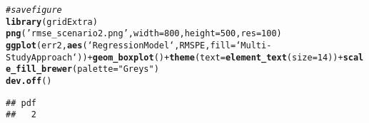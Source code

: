\documentclass{article}\usepackage[]{graphicx}\usepackage[]{color}
\makeatletter
\newcommand{\hlnum}[1]{\textcolor[rgb]{0.686,0.059,0.569}{#1}}%
\newcommand{\hlstr}[1]{\textcolor[rgb]{0.192,0.494,0.8}{#1}}%
\newcommand{\hlcom}[1]{\textcolor[rgb]{0.678,0.584,0.686}{\textit{#1}}}%
\newcommand{\hlopt}[1]{\textcolor[rgb]{0,0,0}{#1}}%
\newcommand{\hlstd}[1]{\textcolor[rgb]{0.345,0.345,0.345}{#1}}%
\newcommand{\hlkwc}[1]{\textcolor[rgb]{0.333,0.667,0.333}{#1}}%
\newcommand{\hlkwd}[1]{\textcolor[rgb]{0.737,0.353,0.396}{\textbf{#1}}}%
\newenvironment{kframe}{%
 \def\at@end@of@kframe{}%
 \ifinner\ifhmode%
  \def\at@end@of@kframe{\end{minipage}}%
  \begin{minipage}{\columnwidth}%
 \fi\fi%
 \def\FrameCommand##1{\hskip\@totalleftmargin \hskip-\fboxsep
 \colorbox{shadecolor}{##1}\hskip-\fboxsep
     \hskip-\linewidth \hskip-\@totalleftmargin \hskip\columnwidth}%
 \MakeFramed {\advance\hsize-\width
   \@totalleftmargin\z@ \linewidth\hsize
   \@setminipage}}%
 {\par\unskip\endMakeFramed%
 \at@end@of@kframe}
\newenvironment{knitrout}{}{} %
\makeatother
\begin{document}
\begin{knitrout}
\begin{kframe}\begin{alltt}
\hlcom{# save figure}
\hlkwd{library}\hlstd{(gridExtra)}
\hlkwd{png}\hlstd{(}\hlstr{'rmse_scenario2.png'}\hlstd{,} \hlkwc{width}\hlstd{=}\hlnum{800}\hlstd{,} \hlkwc{height}\hlstd{=}\hlnum{500}\hlstd{,} \hlkwc{res}\hlstd{=}\hlnum{100}\hlstd{)}
\hlkwd{ggplot}\hlstd{(err2,} \hlkwd{aes}\hlstd{(`Regression Model`, RMSPE,} \hlkwc{fill}\hlstd{=`Multi-Study Approach`))} \hlopt{+} \hlkwd{geom_boxplot}\hlstd{()} \hlopt{+} \hlkwd{theme}\hlstd{(}\hlkwc{text} \hlstd{=} \hlkwd{element_text}\hlstd{(}\hlkwc{size} \hlstd{=} \hlnum{14}\hlstd{))} \hlopt{+} \hlkwd{scale_fill_brewer}\hlstd{(}\hlkwc{palette}\hlstd{=}\hlstr{"Greys"}\hlstd{)}
\hlkwd{dev.off}\hlstd{()}
\end{alltt}
\begin{verbatim}
## pdf 
##   2
\end{verbatim}
\end{kframe}
\end{knitrout}
\end{document}
